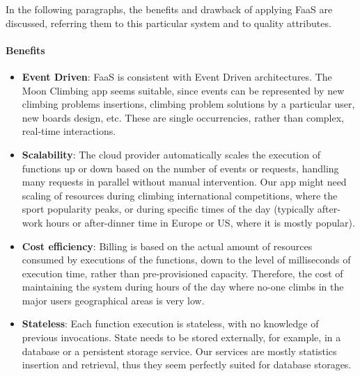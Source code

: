 \documentclass{article}
\begin{document}
In the following paragraphs, the benefits and drawback of applying FaaS are discussed, referring them to this particular system and to quality attributes.

\paragraph*{Benefits}
\begin{itemize}
    \item \textbf{Event Driven}: FaaS is consistent with Event Driven architectures. The Moon Climbing app seems suitable, since events can be represented by new climbing problems insertions, climbing problem solutions by a particular user, new boards design, etc. These are single occurrencies, rather than complex, real-time interactions.
    \item \textbf{Scalability}: The cloud provider automatically scales the execution of functions up or down based on the number of events or requests, handling many requests in parallel without manual intervention. Our app might need scaling of resources during climbing international competitions, where the sport popularity peaks, or during specific times of the day (typically after-work hours or after-dinner time in Europe or US, where it is mostly popular).
    \item \textbf{Cost efficiency}: Billing is based on the actual amount of resources consumed by executions of the functions, down to the level of milliseconds of execution time, rather than pre-provisioned capacity. Therefore, the cost of maintaining the system during hours of the day where no-one climbs in the major users geographical areas is very low.
    \item \textbf{Stateless}: Each function execution is stateless, with no knowledge of previous invocations. State needs to be stored externally, for example, in a database or a persistent storage service. Our services are mostly statistics insertion and retrieval, thus they seem perfectly suited for database storages.
\end{itemize}
\end{document}
